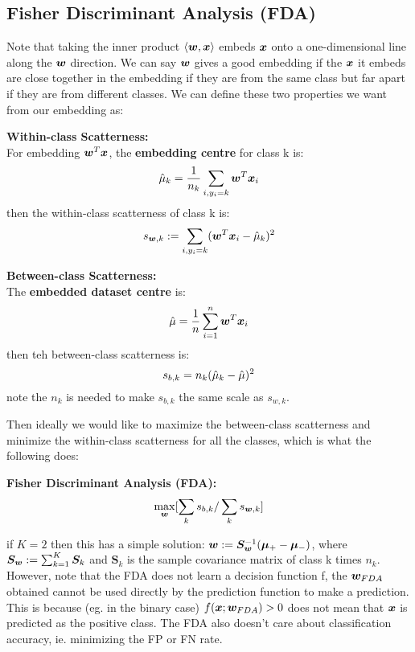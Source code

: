 \subsection{Fisher Discriminant Analysis (FDA)}
Note that taking the inner product $\langle \bm{w}, \bm{x} \rangle$ embeds $\bm{x}$ onto a one-dimensional line along the $\bm{w}$ direction. We can say $\bm{w}$ gives a good embedding if the $\bm{x}$ it embeds are close together in the embedding if they are from the same class but far apart if they are from different classes. We can define these two properties we want from our embedding as:
\begin{definition}
    \textbf{Within-class Scatterness:} \\
    For embedding $\bm{w}^{T} \bm{x}$, the \textbf{embedding centre} for class k is:
    \begin{equation}
        \hat{\mu}_{k} = \frac{1}{n_{k}} \sum_{i, y_{i}=k} \bm{w}^{T} \bm{x}_{i}
    \end{equation}
    then the within-class scatterness of class k is:
    \begin{equation}
        s_{\bm{w},k} := \sum_{i,y_{i}=k} (\bm{w}^{T} \bm{x}_{i} - \hat{\mu}_{k})^{2}
    \end{equation}
\end{definition}
\begin{definition}
    \textbf{Between-class Scatterness:} \\
    The \textbf{embedded dataset centre} is:
    \begin{equation}
        \hat{\mu} = \frac{1}{n} \sum_{i=1}^{n} \bm{w}^{T} \bm{x}_{i}
    \end{equation}
    then teh between-class scatterness is:
    \begin{equation}
        s_{b,k} = n_{k} (\hat{\mu}_{k} - \hat{\mu})^{2}
    \end{equation}
    note the $n_{k}$ is needed to make $s_{b,k}$ the same scale as $s_{w,k}$.
\end{definition}
Then ideally we would like to maximize the between-class scatterness and minimize the within-class scatterness for all the classes, which is what the following does:
\begin{definition}
    \textbf{Fisher Discriminant Analysis (FDA):} \\
    \begin{equation}
        \max_{\bm{w}} [\sum_{k} s_{b,k} / \sum_{k} s_{\bm{w},k} ]
    \end{equation}
\end{definition}
if $K=2$ then this has a simple solution: $\bm{w} := \bm{S}_{\bm{w}}^{-1} (\bm{\mu}_{+} - \bm{\mu}_{-})$, where $\bm{S}_{\bm{w}} := \sum_{k=1}^{K} \bm{S}_{k}$ and $\bm{S}_{k}$ is the sample covariance matrix of class k times $n_{k}$. However, note that the FDA does not learn a decision function f, the $\bm{w}_{FDA}$ obtained cannot be used directly by the prediction function to make a prediction. This is because (eg. in the binary case) $f(\bm{x};\bm{w}_{FDA})>0$ does not mean that $\bm{x}$ is predicted as the positive class. The FDA also doesn't care about classification accuracy, ie. minimizing the FP or FN rate.

